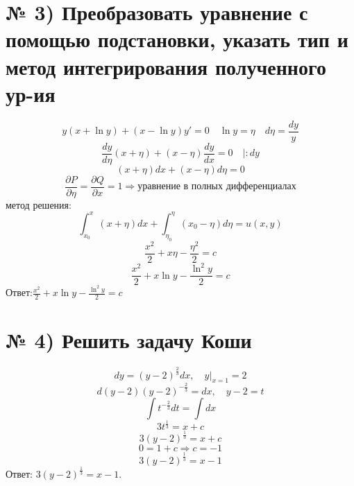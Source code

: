 \documentclass[a4paper]{article}
\begin{document}
\section*{№ 3) Преобразовать уравнение с помощью подстановки, указать тип и метод интегрирования полученного ур-ия}
\begin{equation*}
y(x+\ln y)+(x-\ln y)y'=0 \quad \ln y = \eta \quad d\eta=\frac{dy}{y}
\end{equation*}
\begin{equation*}
\frac{dy}{d\eta}(x+\eta)+(x-\eta)\frac{dy}{dx}=0 \quad |:dy
\end{equation*}
\begin{equation*}
(x+\eta)dx+(x-\eta)d\eta=0
\end{equation*}
\begin{equation*}
\frac{\partial P}{\partial \eta}=\frac{\partial Q}{\partial x}=1 \Rightarrow \text{уравнение в полных дифференциалах}
\end{equation*}
метод решения:
\begin{equation*}
\int_{x_0}^{x}(x+\eta)dx+\int_{\eta_0}^{\eta}(x_0-\eta)d\eta=u(x,y)
\end{equation*}
\begin{equation*}
\frac{x^2}{2}+x\eta-\frac{\eta^2}{2}=c
\end{equation*}
\begin{equation*}
\frac{x^2}{2}+x\ln y-\frac{\ln^2{y}}{2}=c
\end{equation*}
Ответ:$\frac{x^2}{2}+x\ln y-\frac{\ln^2{y}}{2}=c$

\section*{№ 4) Решить задачу Коши}
\begin{equation*}
dy=(y-2)^{\frac{2}{3}}dx,\quad y|_{x=1}=2
\end{equation*}
\begin{equation*}
d(y-2)(y-2)^{-\frac{2}{3}}=dx, \quad y-2=t
\end{equation*}
\begin{equation*}
\int t^{-\frac{2}{3}}dt=\int dx
\end{equation*}
\begin{equation*}
3t^{\frac{1}{3}}=x+c
\end{equation*}
\begin{equation*}
3(y-2)^{\frac{1}{3}}=x+c
\end{equation*}
\begin{equation*}
0=1+c \Rightarrow c=-1
\end{equation*}
\begin{equation*}
3(y-2)^{\frac{1}{3}}=x-1
\end{equation*}
Ответ: $3(y-2)^{\frac{1}{3}}=x-1$.
\end{document}
